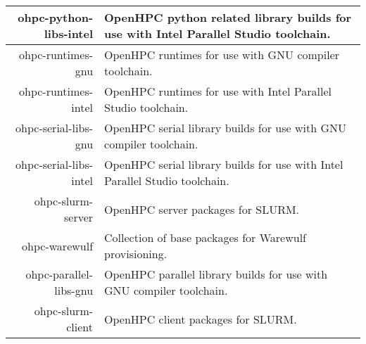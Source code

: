 \begin{tabularx}{\textwidth}{r|X}
ohpc-python-libs-intel & OpenHPC python related library builds for use with Intel Parallel Studio toolchain. \\ \hline 
ohpc-runtimes-gnu & OpenHPC runtimes for use with GNU compiler toolchain. \\ \hline 
ohpc-runtimes-intel & OpenHPC runtimes for use with Intel Parallel Studio toolchain. \\ \hline 
ohpc-serial-libs-gnu & OpenHPC serial library builds for use with GNU compiler toolchain. \\ \hline 
ohpc-serial-libs-intel & OpenHPC serial library builds for use with Intel Parallel Studio toolchain. \\ \hline 
ohpc-slurm-server & OpenHPC server packages for SLURM. \\ \hline 
ohpc-warewulf & Collection of base packages for Warewulf provisioning. \\ \hline 
ohpc-parallel-libs-gnu & OpenHPC parallel library builds for use with GNU compiler toolchain. \\ \hline 
ohpc-slurm-client & OpenHPC client packages for SLURM. \\ \hline 
\bottomrule
\end{tabularx}
